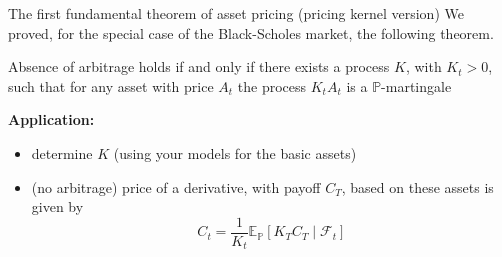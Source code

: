 \documentclass[pdf, handout]{beamer}
\renewcommand{\calF}{\mathcal{F}}
\begin{document}
\begin{frame}{The first fundamental theorem of asset pricing (pricing kernel version)}
We proved, for the special case of the Black-Scholes market, the following theorem.
\begin{theorem}
Absence of arbitrage holds if and only if there exists a process $K$, with $K_t>0$, such that
for any asset with price $A_t$ the process $K_t A_t$ is a $\mathbb{P}$-martingale
\end{theorem}
\textbf{Application:}
\begin{itemize}
\item determine $K$ (using your models for the basic assets)
\item (no arbitrage) price of a derivative, with payoff $C_T$, based on these assets is given by
\[
C_t=\frac{1}{K_t}\mathbb{E}_{\mathbb{P}}[ K_T C_T \mid \calF_t]
\]
\end{itemize}

\end{frame}
\end{document}
